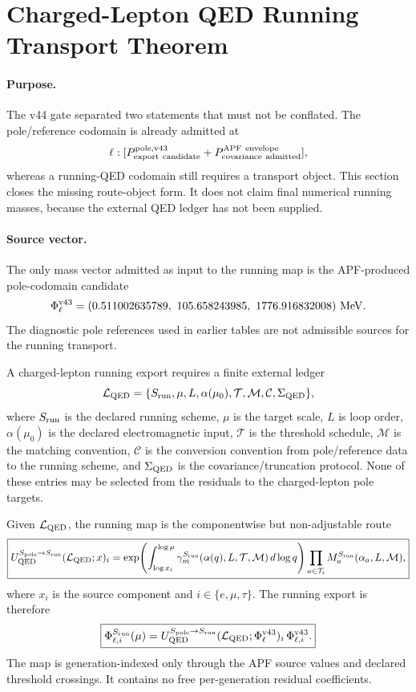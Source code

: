 
\section{Charged-Lepton QED Running Transport Theorem}\label{sec:v45_qed_running_transport}

\paragraph{Purpose.}
The v44 gate separated two statements that must not be conflated.  The pole/reference codomain is already admitted at
\[
\ell:[P_{\rm export\ candidate}^{\rm pole,v43}+P_{\rm covariance\ admitted}^{\rm APF\ envelope}],
\]
whereas a running-QED codomain still requires a transport object.  This section closes the missing route-object form.  It does not claim final numerical running masses, because the external QED ledger has not been supplied.

\paragraph{Source vector.}
The only mass vector admitted as input to the running map is the APF-produced pole-codomain candidate
\[
\Phi_\ell^{\rm v43}= (0.511002635789,\ 105.658243985,\ 1776.916832008)\ {\rm MeV}.
\]
The diagnostic pole references used in earlier tables are not admissible sources for the running transport.

\begin{definition}\label{def:v45_qed_ledger}
A charged-lepton running export requires a finite external ledger
\[
\mathcal L_{\rm QED}=\{S_{\rm run},\mu,L,\alpha(\mu_0),\mathcal T,\mathcal M,\mathcal C,\Sigma_{\rm QED}\},
\]
where $S_{\rm run}$ is the declared running scheme, $\mu$ is the target scale, $L$ is loop order, $\alpha(\mu_0)$ is the declared electromagnetic input, $\mathcal T$ is the threshold schedule, $\mathcal M$ is the matching convention, $\mathcal C$ is the conversion convention from pole/reference data to the running scheme, and $\Sigma_{\rm QED}$ is the covariance/truncation protocol.  None of these entries may be selected from the residuals to the charged-lepton pole targets.
\end{definition}

\begin{definition}\label{def:v45_qed_transport}
Given $\mathcal L_{\rm QED}$, the running map is the componentwise but non-adjustable route
\[
\boxed{
U_{\rm QED}^{S_{\rm pole}\to S_{\rm run}}(\mathcal L_{\rm QED};x)_i
=\exp\!\left(\int_{\log x_i}^{\log\mu}\gamma_m^{S_{\rm run}}(\alpha(q),L,\mathcal T,\mathcal M)\,d\log q\right)
\prod_{a\in\mathcal T_i}M_a^{S_{\rm run}}(\alpha_a,L,\mathcal M),
}
\]
where $x_i$ is the source component and $i\in\{e,\mu,\tau\}$.  The running export is therefore
\[
\boxed{
\Phi_{\ell,i}^{S_{\rm run}}(\mu)
=U_{\rm QED}^{S_{\rm pole}\to S_{\rm run}}(\mathcal L_{\rm QED};\Phi_\ell^{\rm v43})_i\,\Phi_{\ell,i}^{\rm v43}.
}
\]
The map is generation-indexed only through the APF source values and declared threshold crossings.  It contains no free per-generation residual coefficients.
\end{definition}

